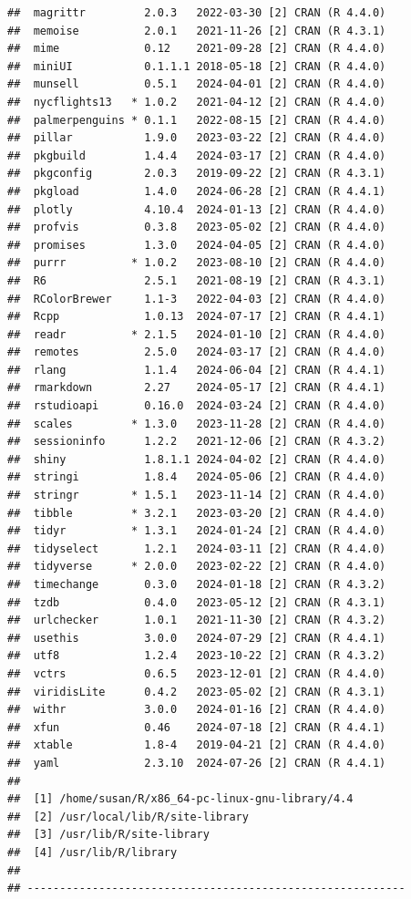 \documentclass[print]{nuthesis}
\begin{document}
\begin{verbatim}
##  magrittr         2.0.3   2022-03-30 [2] CRAN (R 4.4.0)
##  memoise          2.0.1   2021-11-26 [2] CRAN (R 4.3.1)
##  mime             0.12    2021-09-28 [2] CRAN (R 4.4.0)
##  miniUI           0.1.1.1 2018-05-18 [2] CRAN (R 4.4.0)
##  munsell          0.5.1   2024-04-01 [2] CRAN (R 4.4.0)
##  nycflights13   * 1.0.2   2021-04-12 [2] CRAN (R 4.4.0)
##  palmerpenguins * 0.1.1   2022-08-15 [2] CRAN (R 4.4.0)
##  pillar           1.9.0   2023-03-22 [2] CRAN (R 4.4.0)
##  pkgbuild         1.4.4   2024-03-17 [2] CRAN (R 4.4.0)
##  pkgconfig        2.0.3   2019-09-22 [2] CRAN (R 4.3.1)
##  pkgload          1.4.0   2024-06-28 [2] CRAN (R 4.4.1)
##  plotly           4.10.4  2024-01-13 [2] CRAN (R 4.4.0)
##  profvis          0.3.8   2023-05-02 [2] CRAN (R 4.4.0)
##  promises         1.3.0   2024-04-05 [2] CRAN (R 4.4.0)
##  purrr          * 1.0.2   2023-08-10 [2] CRAN (R 4.4.0)
##  R6               2.5.1   2021-08-19 [2] CRAN (R 4.3.1)
##  RColorBrewer     1.1-3   2022-04-03 [2] CRAN (R 4.4.0)
##  Rcpp             1.0.13  2024-07-17 [2] CRAN (R 4.4.1)
##  readr          * 2.1.5   2024-01-10 [2] CRAN (R 4.4.0)
##  remotes          2.5.0   2024-03-17 [2] CRAN (R 4.4.0)
##  rlang            1.1.4   2024-06-04 [2] CRAN (R 4.4.1)
##  rmarkdown        2.27    2024-05-17 [2] CRAN (R 4.4.1)
##  rstudioapi       0.16.0  2024-03-24 [2] CRAN (R 4.4.0)
##  scales         * 1.3.0   2023-11-28 [2] CRAN (R 4.4.0)
##  sessioninfo      1.2.2   2021-12-06 [2] CRAN (R 4.3.2)
##  shiny            1.8.1.1 2024-04-02 [2] CRAN (R 4.4.0)
##  stringi          1.8.4   2024-05-06 [2] CRAN (R 4.4.0)
##  stringr        * 1.5.1   2023-11-14 [2] CRAN (R 4.4.0)
##  tibble         * 3.2.1   2023-03-20 [2] CRAN (R 4.4.0)
##  tidyr          * 1.3.1   2024-01-24 [2] CRAN (R 4.4.0)
##  tidyselect       1.2.1   2024-03-11 [2] CRAN (R 4.4.0)
##  tidyverse      * 2.0.0   2023-02-22 [2] CRAN (R 4.4.0)
##  timechange       0.3.0   2024-01-18 [2] CRAN (R 4.3.2)
##  tzdb             0.4.0   2023-05-12 [2] CRAN (R 4.3.1)
##  urlchecker       1.0.1   2021-11-30 [2] CRAN (R 4.3.2)
##  usethis          3.0.0   2024-07-29 [2] CRAN (R 4.4.1)
##  utf8             1.2.4   2023-10-22 [2] CRAN (R 4.3.2)
##  vctrs            0.6.5   2023-12-01 [2] CRAN (R 4.4.0)
##  viridisLite      0.4.2   2023-05-02 [2] CRAN (R 4.3.1)
##  withr            3.0.0   2024-01-16 [2] CRAN (R 4.4.0)
##  xfun             0.46    2024-07-18 [2] CRAN (R 4.4.1)
##  xtable           1.8-4   2019-04-21 [2] CRAN (R 4.4.0)
##  yaml             2.3.10  2024-07-26 [2] CRAN (R 4.4.1)
## 
##  [1] /home/susan/R/x86_64-pc-linux-gnu-library/4.4
##  [2] /usr/local/lib/R/site-library
##  [3] /usr/lib/R/site-library
##  [4] /usr/lib/R/library
## 
## ----------------------------------------------------------
\end{verbatim}
\end{document}
